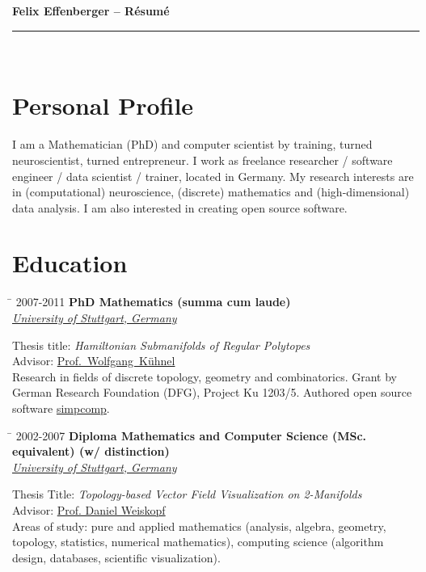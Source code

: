 \documentclass[10pt]{article} %
\newlength{\smallertextwidth}
\renewcommand{\title}[1]{
{\huge{\color{headercolor}\textbf{#1}}}\\
\rule{\textwidth}{0.5mm}\\
}
\newcommand{\education}[4]{
\begin{tabbing}%
\hspace{2.2cm}\=\kill%
{#1} \> \textbf{#2}\\
\>\+ \textit{#3}\\[3pt]
\begin{minipage}{\smallertextwidth}
\vspace{2mm}
#4
\end{minipage}
\end{tabbing}
\vspace{2mm}
}
\begin{document}

\title{Felix Effenberger -- Résumé}


\section{Personal Profile}
%
I am a Mathematician (PhD) and computer scientist by training, turned neuroscientist, turned entrepreneur. 
I work as freelance researcher / software engineer / data scientist / trainer, located in Germany.
My research interests are in (computational) neuroscience, (discrete) mathematics and (high-dimensional) data analysis.
I am also interested in creating open source software.


\section{Education}
%
\education
{2007-2011}
{PhD Mathematics \textmd{(summa cum laude)}}
{\href{https://uni-stuttgart.de}{University of Stuttgart, Germany}}
{
Thesis title: \textit{Hamiltonian Submanifolds of Regular Polytopes}\\
Advisor: \href{http://www.igt.uni-stuttgart.de/LstDiffgeo/Kuehnel/}{Prof.~Wolfgang~Kühnel}\\[5pt]
%
Research in fields of discrete topology, geometry and combinatorics.
Grant by German Research Foundation (DFG), Project Ku 1203/5.
Authored open source software \href{https://github.com/simpcomp-team/simpcomp}{simpcomp}.
}

\education
{2002-2007}
{Diploma Mathematics and Computer Science (MSc. equivalent) \textmd{(w/ distinction)}}
{\href{https://uni-stuttgart.de}{University of Stuttgart, Germany}}
{
Thesis Title: \textit{Topology-based Vector Field Visualization on 2-Manifolds}\\
Advisor: \href{https://www.vis.uni-stuttgart.de/institut/mitarbeiter/Weiskopf-00001/}{Prof. Daniel Weiskopf}\\[5pt]
%
Areas of study: pure and applied mathematics (analysis, algebra, geometry, topology, statistics, numerical mathematics), 
computing science (algorithm design, databases, scientific visualization).
}
\end{document}
